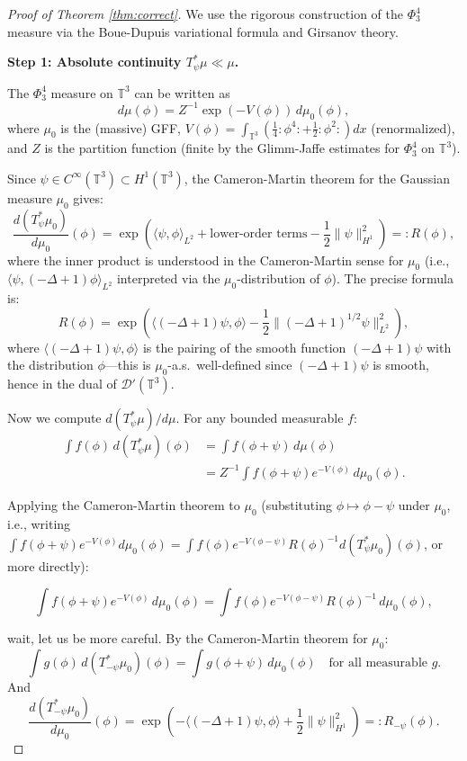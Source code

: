 \documentclass[12pt]{article}
\theoremstyle{definition}
\begin{document}
\begin{proof}[Proof of Theorem \ref{thm:correct}]
We use the rigorous construction of the $\Phi^4_3$ measure via the Boue-Dupuis variational formula and Girsanov theory.

\textbf{Step 1: Absolute continuity $T_\psi^*\mu \ll \mu$.}

The $\Phi^4_3$ measure on $\mathbb{T}^3$ can be written as
$$d\mu(\phi) = Z^{-1} \exp(-V(\phi))\, d\mu_0(\phi),$$
where $\mu_0$ is the (massive) GFF, $V(\phi) = \int_{\mathbb{T}^3}\left(\frac{1}{4}:\!\phi^4\!: + \frac{1}{2}:\!\phi^2\!:\right)dx$ (renormalized), and $Z$ is the partition function (finite by the Glimm-Jaffe estimates for $\Phi^4_3$ on $\mathbb{T}^3$).

Since $\psi \in C^\infty(\mathbb{T}^3) \subset H^1(\mathbb{T}^3)$, the Cameron-Martin theorem for the Gaussian measure $\mu_0$ gives:
$$\frac{d(T_\psi^*\mu_0)}{d\mu_0}(\phi) = \exp\!\left(\langle \psi, \phi\rangle_{L^2} + \text{lower-order terms} - \frac{1}{2}\|\psi\|_{H^1}^2\right) =: R(\phi),$$
where the inner product is understood in the Cameron-Martin sense for $\mu_0$ (i.e., $\langle \psi, (-\Delta+1)\phi\rangle_{L^2}$ interpreted via the $\mu_0$-distribution of $\phi$). The precise formula is:
$$R(\phi) = \exp\!\left(\langle (-\Delta+1)\psi, \phi\rangle - \frac{1}{2}\|(-\Delta+1)^{1/2}\psi\|_{L^2}^2\right),$$
where $\langle (-\Delta+1)\psi, \phi\rangle$ is the pairing of the smooth function $(-\Delta+1)\psi$ with the distribution $\phi$—this is $\mu_0$-a.s.\ well-defined since $(-\Delta+1)\psi$ is smooth, hence in the dual of $\mathcal{D}'(\mathbb{T}^3)$.

Now we compute $d(T_\psi^*\mu)/d\mu$. For any bounded measurable $f$:
\begin{align*}
\int f(\phi)\, d(T_\psi^*\mu)(\phi) &= \int f(\phi + \psi)\, d\mu(\phi) \\
&= Z^{-1}\int f(\phi+\psi) e^{-V(\phi)}\, d\mu_0(\phi).
\end{align*}

Applying the Cameron-Martin theorem to $\mu_0$ (substituting $\phi \mapsto \phi - \psi$ under $\mu_0$, i.e., writing $\int f(\phi+\psi) e^{-V(\phi)} d\mu_0(\phi) = \int f(\phi) e^{-V(\phi-\psi)} R(\phi)^{-1} d(T_\psi^* \mu_0)(\phi)$, or more directly):

$$\int f(\phi+\psi) e^{-V(\phi)}\, d\mu_0(\phi) = \int f(\phi) e^{-V(\phi-\psi)} R(\phi)^{-1}\, d\mu_0(\phi),$$

wait, let us be more careful. By the Cameron-Martin theorem for $\mu_0$:
$$\int g(\phi)\, d(T_{-\psi}^* \mu_0)(\phi) = \int g(\phi+\psi)\, d\mu_0(\phi) \quad \text{for all measurable } g.$$
And
$$\frac{d(T_{-\psi}^*\mu_0)}{d\mu_0}(\phi) = \exp\!\left(-\langle (-\Delta+1)\psi, \phi\rangle + \frac{1}{2}\|\psi\|_{H^1}^2\right) =: R_{-\psi}(\phi).$$


\end{proof}
\end{document}
